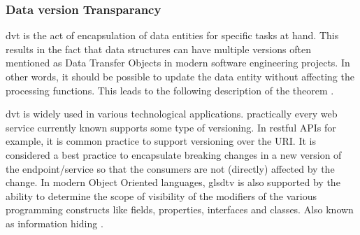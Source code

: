 \subsubsection{Data version Transparancy}

\gls{dvt} is the act of encapsulation of data entities for specific tasks at hand. This
results in the fact that data structures can have multiple versions often mentioned as
Data Transfer Objects in modern software engineering projects. In other words, it should
be possible to update the data entity without affecting the processing functions. This
leads to the following description of the theorem \parencite[280]{mannaert_normalized_2016}.


\gls{dvt} is widely used in various technological applications. practically every web
service currently known supports some type of versioning. In restful APIs for example, it
is common practice to support versioning over the URI. It is considered a best practice
to encapsulate breaking changes in a new version of the endpoint/service so that the
consumers are not (directly) affected by the change. In modern Object Oriented languages,
gls{dtv} is also supported by the ability to determine the scope of visibility of the
modifiers of the various programming constructs like fields, properties, interfaces and
classes. Also known as information hiding
\parencites{parnas_criteria_1972}[278]{mannaert_normalized_2016}.